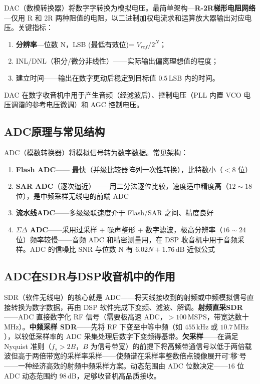 \documentclass[12pt,UTF8]{ctexbook}
\begin{document}
DAC（数模转换器）将数字字转换为模拟电压。最简单架构—\textbf{R-2R梯形电阻网络}—仅用 R 和 2R 两种阻值的电阻，以二进制加权电流求和运算放大器输出对应电压。关键指标：
\begin{enumerate}
\item \textbf{分辨率}—位数 N，LSB (最低有效位)= $V_{ref}/2^N$；
\item INL/DNL（积分/微分非线性）——实际输出偏离理想值的程度；
\item 建立时间——输出在数字更动后稳定到目标值 $0.5\,\mathrm{LSB}$ 内的时间。
\end{enumerate}
DAC 在数字收音机中用于产生音频（经滤波后）、控制电压（PLL 内置 VCO 电压调谐的参考电压微调）和 AGC 控制电压。

\subsection{ADC原理与常见结构}

ADC（模数转换器）将模拟信号转为数字数据。常见架构：
\begin{enumerate}
\item \textbf{Flash ADC}—— 最快（并级比较器阵列一次性转换），比特数小（$<8$ 位）
\item \textbf{SAR ADC}（逐次逼近）——用二分法逐位比较，速度适中精度高（$12\sim18$ 位），是中频采样无线电的前端 ADC
\item \textbf{流水线ADC}——多级级联速度介于 Flash/SAR 之间、精度良好
\item \textbf{$\Sigma\Delta$ ADC}——采用过采样 + 噪声整形 + 数字滤波，极高分辨率（$16\sim24$ 位）频率较慢——音频 ADC 和精密测量用，在 DSP 收音机中用于音频采样。ADC 的信噪比 SNR 与位数 N 有 $6.02N+1.76\,\mathrm{dB}$ 近似公式
\end{enumerate}

\subsection{ADC在SDR与DSP收音机中的作用}

SDR（软件无线电）的核心就是 ADC——将天线接收到的射频或中频模拟信号直接转换为数字数据，再由 DSP 软件完成下变频、滤波、解调。\textbf{射频直采SDR}——ADC 直接数字化 RF 信号（需要极高速 ADC，$>100\,\mathrm{MSPS}$，带宽达数十 MHz）。\textbf{中频采样 SDR}——先将 RF 下变至中等中频（如 $455\,\mathrm{kHz}$ 或 $10.7\,\mathrm{MHz}$），以较低采样率的 ADC 采集处理后数字下变频得基带。\textbf{欠采样}——在满足 Nyquist 准则（$f_s > 2B$，$B$ 为信号带宽）的前提下将高频带通信号以低于两倍载波但高于两倍带宽的采样率采样——使频谱在采样率整数倍点镜像展开可\"搬移\"信号——一种经济高效的射频中频采样方案。动态范围由 ADC 位数决定——$16$ 位 ADC 动态范围约 $98\,\mathrm{dB}$，足够收音机高品质接收。
\end{document}
